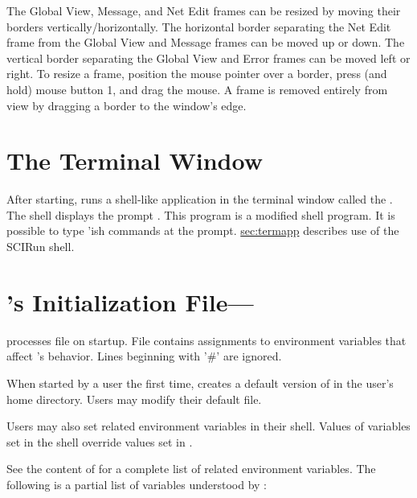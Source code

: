 The Global View, Message, and Net Edit frames can be resized by moving
their borders vertically/horizontally.  The horizontal border separating
the Net Edit frame from the Global View and Message frames can be moved
up or down.  The vertical border separating the Global View and Error
frames can be moved left or right.  To resize a frame, position the
mouse pointer over a border, press (and hold) mouse button 1, and drag
the mouse.  A frame is removed entirely from view by dragging a border
to the window's edge.


\section{The Terminal Window}
\label{sec:termwinapp}

After starting, \sr{} runs a shell-like application in the
terminal window called the .  The \sr{} shell displays the
prompt .  This program is  a modified  shell program. It is possible to type
'ish \sr{} commands at the prompt.  \hyperref{A later
  section}{Section~}{}{sec:termapp} describes use of the SCIRun shell.


\section{\sr{}'s Initialization File---}
\label{sec:scirunrc}

\sr{} processes  file on startup.  File
 contains assignments to environment variables
that affect \sr{}'s behavior.  Lines beginning with '\#' are ignored.

When started by a user the first time, \sr{} creates a default version of
 in the user's home directory.  Users may modify
their default  file.

Users may also set \sr{} related environment variables in their
shell.  Values of variables set in the shell override values set in
.

See the content of  for a complete list of \sr{}
related environment variables.  The following
is a partial list of variables understood by \sr{}:

\newcommand{\envitem}[1]{\item[\envvar{#1}]\latex{\mbox{}\\}}

